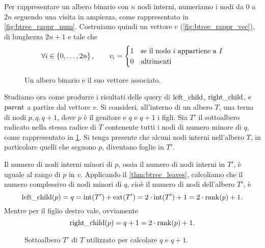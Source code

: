 Per rappresentare un albero binario con $n$ nodi interni, numeriamo i nodi da $0$ a $2n$ seguendo una visita in ampiezza, come rappresentato in \cref{fig:btree_rappr_num}.
Costruiamo quindi un vettore $v$ (\cref{fig:btree_rappr_vec}), di lunghezza $2n+1$ e tale che
\begin{equation*}
	\forall i\in\left\{ 0,\dots,2n \right\},\qquad v_i = \begin{cases}
		1 & \text{se il nodo $i$ appartiene a $I$} \\
		0 & \text{altrimenti}
	\end{cases}
\end{equation*}

\begin{figure}
	\centering
	
	\caption{Un albero binario e il suo vettore associato.}
\end{figure}

Studiamo ora come produrre i risultati delle query di $\mathrm{left\_child}$, $\mathrm{right\_child}$, e $\mathrm{parent}$ a partire dal vettore $v$. Si consideri, all'interno di un albero $T$, una terna di nodi $p,q,q+1$, dove $p$ è il genitore e $q$ e $q+1$ i figli. Sia $T'$ il sottoalbero radicato nella stessa radice di $T$ contenente tutti i nodi di numero minore di $q$, come rappresentato in \cref{fig:btree_rappr_step}. Si tenga presente che alcuni nodi interni nell'albero $T$, in particolare quelli che seguono $p$, diventano foglie in $T'$.

Il numero di nodi interni minori di $p$, ossia il numero di nodi interni in $T'$, è uguale al rango di $p$ in $v$. Applicando il \cref{thm:btree_leaves}, calcoliamo che il numero complessivo di nodi minori di $q$, cioè il numero di nodi dell'albero $T'$, è
\begin{equation}\label{eq:btree:left_child}
	\mathrm{left\_child}(p) = q = \mathrm{int}(T')+\mathrm{ext}(T') = 2\cdot\mathrm{int}(T')+1 = 2\cdot\mathrm{rank}(p)+1 \text.
\end{equation}
Mentre per il figlio destro vale, ovviamente
\begin{equation}\label{eq:btree:right_child}
	\mathrm{right\_child}(p) = q+1 = 2\cdot\mathrm{rank}(p)+1 \text.
\end{equation}

\begin{figure}
	\centering
	
	\caption{Sottoalbero $T'$ di $T$ utilizzato per calcolare $q$ e $q+1$.}
	\label{fig:btree_rappr_step}
\end{figure}

